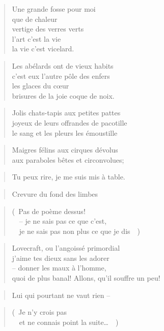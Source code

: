   \begin{verse}
    Une grande fosse pour moi\\
    que de chaleur\\
    vertige des verres verts\\
    l’art c’est la vie\\
    la vie c’est vicelard.
  \end{verse}
  \begin{verse}
    Les abélards ont de vieux habits\\
    c’est eux l’autre pôle des enfers\\
    les glaces du cœur\\
    brisures de la joie coque de noix.
  \end{verse}
  \begin{verse}
    Jolis chats-tapis aux petites pattes\\
    joyeux de leurs offrandes de pacotille\\
    le sang et les pleurs les émoustille
  \end{verse}
  \begin{verse}
    Maigres félins aux cirques dévolus\\
    aux paraboles bêtes et circonvolues;
  \end{verse}
  \begin{verse}
    Tu peux rire, je me suis mis à table.
  \end{verse}
  \begin{verse}
    Crevure du fond des limbes
  \end{verse}
  \begin{verse}
    (~Pas de poème dessus!\\
    ~~-- je ne sais pas ce que c’est,\\
    ~~je ne sais pas non plus ce que je dis~~)
  \end{verse}
  \begin{verse}
    Lovecraft, ou l’angoissé primordial\\
    j’aime tes dieux sans les adorer\\
    -- donner les maux à l’homme,\\
    quoi de plus banal! Allons, qu’il souffre un peu!
  \end{verse}
  \begin{verse}
    Lui qui pourtant ne vaut rien --
  \end{verse}
  \begin{verse}
    (~Je n’y crois pas\\
    ~~et ne connais point la suite…~~)
  \end{verse}
